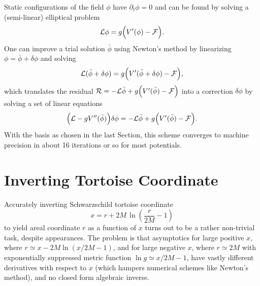 \documentclass[aps,prd,reprint,twocolumn,groupedaddress]{revtex4-1}
\begin{document}
Static configurations of the field $\phi$ have $\partial_t \phi = 0$ and can be found by solving a (semi-linear) elliptical problem
\begin{equation}
  {\cal L}\phi = g \Big( V'(\phi) - {\cal F} \Big).
\end{equation}
One can improve a trial solution $\bar\phi$ using Newton's method by linearizing $\phi = \bar\phi + \delta\phi$ and solving
\begin{equation}
  {\cal L}(\bar\phi + \delta\phi) = g \Big( V'(\bar\phi + \delta\phi) - {\cal F} \Big),
\end{equation}
which translates the residual ${\cal R} = -{\cal L}\bar\phi + g \Big( V'(\bar\phi) - {\cal F} \Big)$ into a correction $\delta\phi$ by solving a set of linear equations
\begin{equation}
  \Big({\cal L} - g V''(\bar\phi)\Big) \delta\phi = -{\cal L}\bar\phi + g \Big( V'(\bar\phi) - {\cal F} \Big).
\end{equation}
With the basis as chosen in the last Section, this scheme converges to machine precision in about 16 iterations or so for most potentials.

\appendix
\section{Inverting Tortoise Coordinate}
\label{sec:tortoise}

Accurately inverting Schwarzschild tortoise coordinate
\begin{equation}
  x = r + 2M\,\ln\left(\frac{r}{2M} - 1\right)
\end{equation}
to yield areal coordinate $r$ as a function of $x$ turns out to be a rather non-trivial task, despite appearances. The problem is that asymptotics for large positive $x$, where $r \simeq x - 2M \ln\left(x/2M - 1\right)$, and for large negative $x$, where $r \simeq 2M$ with exponentially suppressed metric function $\ln g \simeq x/2M - 1$, have vastly different derivatives with respect to $x$ (which hampers numerical schemes like Newton's method), and no closed form algebraic inverse.

\end{document}
